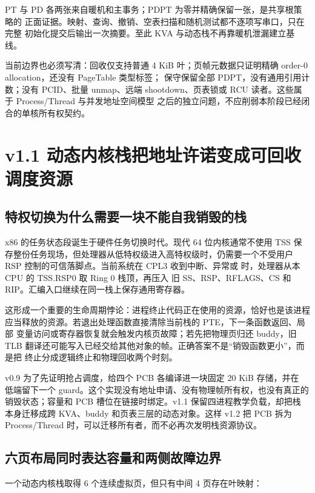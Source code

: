 PT 与 PD 各两张来自暖机和主事务；PDPT 为零并精确保留一张，是共享根策略的
正面证据。映射、查询、撤销、空表扫描和随机测试都不逐项写串口，只在完整
初始化提交后输出一次摘要。至此 KVA 与动态栈不再靠暖机泄漏建立基线。

当前边界也必须写清：回收仅支持普通 4 KiB 叶；页帧元数据只证明精确
order-0 allocation，还没有 PageTable 类型标签；
保守保留全部 PDPT，没有通用引用计数；没有 PCID、批量 unmap、远端
shootdown、页表锁或 RCU 读者。这些属于 Process/Thread 与并发地址空间模型
之后的独立问题，不应削弱本阶段已经闭合的单核所有权契约。

\section{v1.1 动态内核栈把地址许诺变成可回收调度资源}

\subsection{特权切换为什么需要一块不能自我销毁的栈}

x86 的任务状态段诞生于硬件任务切换时代。现代 64 位内核通常不使用 TSS
保存整份任务现场，但处理器从低特权级进入高特权级时，仍需要一个不受用户
RSP 控制的可信落脚点。当前系统在 CPL3 收到中断、异常或
 时，处理器从本 CPU 的 TSS.RSP0 取 Ring 0 栈顶，再压入
旧 SS、RSP、RFLAGS、CS 和 RIP。汇编入口继续在同一栈上保存通用寄存器。

这形成一个重要的生命周期悖论：进程终止代码正在使用的资源，恰好也是该进程
应当释放的资源。若退出处理函数直接清除当前栈的 PTE，下一条函数返回、局部
变量访问或寄存器恢复就会触发内核页故障；若先把物理页归还 buddy，旧 TLB
翻译还可能写入已经交给其他对象的帧。正确答案不是“销毁函数更小”，而是把
终止分成逻辑终止和物理回收两个时刻。

v0.9 为了先证明抢占调度，给四个 PCB 各编译进一块固定 20 KiB 存储，并在
低端留下一个 guard。这个实现没有地址申请、没有物理帧所有权，也没有真正的
销毁状态；容量和 PCB 槽位在链接时绑定。v1.1 保留四进程教学负载，却把栈
本身迁移成跨 KVA、buddy 和页表三层的动态对象。这样 v1.2 把 PCB 拆为
Process/Thread 时，可以迁移所有者，而不必再次发明栈资源协议。

\subsection{六页布局同时表达容量和两侧故障边界}

一个动态内核栈取得 6 个连续虚拟页，但只有中间 4 页存在叶映射：

